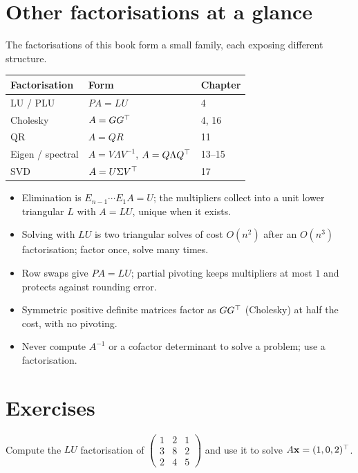 \section{Other factorisations at a glance}

The factorisations of this book form a small family, each exposing different structure.

\begin{center}
\begin{tabular}{lll}
\toprule
Factorisation & Form & Chapter \\
\midrule
LU / PLU & $PA=LU$ & 4 \\
Cholesky & $A=GG^{\top}$ & 4, 16 \\
QR & $A=QR$ & 11 \\
Eigen / spectral & $A=V\Lambda V^{-1}$, $A=Q\Lambda Q^{\top}$ & 13--15 \\
SVD & $A=U\Sigma V^{\top}$ & 17 \\
\bottomrule
\end{tabular}
\end{center}

\begin{summarybox}
\begin{itemize}
  \item Elimination is $E_{n-1}\cdots E_1A=U$; the multipliers collect into a unit lower triangular $L$ with $A=LU$, unique when it exists.
  \item Solving with $LU$ is two triangular solves of cost $O(n^2)$ after an $O(n^3)$ factorisation; factor once, solve many times.
  \item Row swaps give $PA=LU$; partial pivoting keeps multipliers at most $1$ and protects against rounding error.
  \item Symmetric positive definite matrices factor as $GG^{\top}$ (Cholesky) at half the cost, with no pivoting.
  \item Never compute $A^{-1}$ or a cofactor determinant to solve a problem; use a factorisation.
\end{itemize}
\end{summarybox}

\section{Exercises}

\begin{exercise}
Compute the $LU$ factorisation of $\begin{pmatrix}1&2&1\\3&8&2\\2&4&5\end{pmatrix}$ and use it to solve $A\mathbf{x}=(1,0,2)^{\top}$.
\end{exercise}

